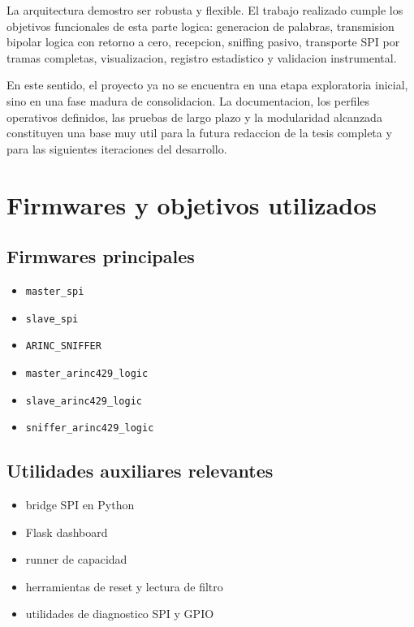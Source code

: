 \documentclass[12pt,a4paper,oneside]{report}
\begin{document}
La arquitectura demostro ser robusta y flexible. El trabajo realizado cumple los objetivos funcionales de esta parte logica: generacion de palabras, transmision bipolar logica con retorno a cero, recepcion, sniffing pasivo, transporte SPI por tramas completas, visualizacion, registro estadistico y validacion instrumental.

En este sentido, el proyecto ya no se encuentra en una etapa exploratoria inicial, sino en una fase madura de consolidacion. La documentacion, los perfiles operativos definidos, las pruebas de largo plazo y la modularidad alcanzada constituyen una base muy util para la futura redaccion de la tesis completa y para las siguientes iteraciones del desarrollo.

\appendix

\chapter{Firmwares y objetivos utilizados}

\section{Firmwares principales}

\begin{itemize}[leftmargin=1.2cm]
    \item \texttt{master\_spi}
    \item \texttt{slave\_spi}
    \item \texttt{ARINC\_SNIFFER}
    \item \texttt{master\_arinc429\_logic}
    \item \texttt{slave\_arinc429\_logic}
    \item \texttt{sniffer\_arinc429\_logic}
\end{itemize}

\section{Utilidades auxiliares relevantes}

\begin{itemize}[leftmargin=1.2cm]
    \item bridge SPI en Python
    \item Flask dashboard
    \item runner de capacidad
    \item herramientas de reset y lectura de filtro
    \item utilidades de diagnostico SPI y GPIO
\end{itemize}
\end{document}
